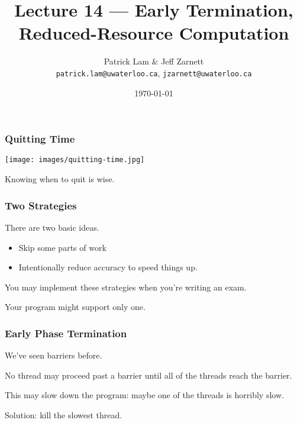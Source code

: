 


\title{Lecture 14 --- Early Termination, Reduced-Resource Computation }

\author{Patrick Lam \& Jeff Zarnett \\ \small \texttt{patrick.lam@uwaterloo.ca}, \texttt{jzarnett@uwaterloo.ca}}
\date{\today}




\begin{frame}
  \titlepage

 \end{frame}


\begin{frame}
\frametitle{Quitting Time}

\begin{center}
	\texttt{[image: images/quitting-time.jpg]}
\end{center}

Knowing when to quit is wise.

\end{frame}


\begin{frame}
\frametitle{Two Strategies}
There are two basic ideas. 

\begin{itemize}
\item Skip some parts of work
\item Intentionally reduce accuracy to speed things up. 
\end{itemize}

You may implement these strategies when you're writing an exam.

Your program might support only one.

\end{frame}



\begin{frame}
  \frametitle{Early Phase Termination}



  We've seen barriers before.

  No thread may proceed past a barrier until all of the threads
reach the barrier.

  This may slow down the program: maybe one of the threads is horribly
  slow.

  Solution: kill the slowest thread.


\end{frame}

